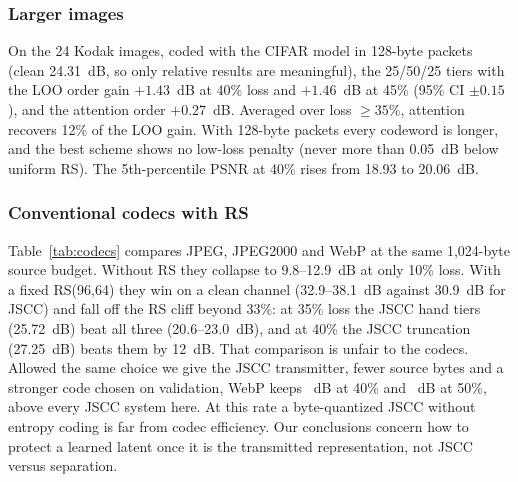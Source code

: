 \documentclass[journal]{IEEEtran}
\begin{document}
\subsubsection{Larger images}
On the 24 Kodak images, coded with the CIFAR model in 128-byte packets (clean 24.31~dB, so only relative
results are meaningful), the 25/50/25 tiers with the LOO order gain $+1.43$~dB at 40\% loss and
$+1.46$~dB at 45\% (95\% CI $\pm0.15$), and the attention order $+0.27$~dB. Averaged over loss $\ge35\%$,
attention recovers 12\% of the LOO gain. With 128-byte packets every codeword is longer, and the best
scheme shows no low-loss penalty (never more than 0.05~dB below uniform RS). The 5th-percentile PSNR at
40\% rises from 18.93 to 20.06~dB.

\subsubsection{Conventional codecs with RS}
Table~\ref{tab:codecs} compares JPEG, JPEG2000 and WebP at the same 1,024-byte source budget. Without RS
they collapse to 9.8--12.9~dB at only 10\% loss. With a fixed RS(96,64) they win on a clean channel
(32.9--38.1~dB against 30.9~dB for JSCC) and fall off the RS cliff beyond 33\%: at 35\% loss the JSCC
hand tiers (25.72~dB) beat all three (20.6--23.0~dB), and at 40\% the JSCC truncation (27.25~dB) beats
them by 12~dB. That comparison is unfair to the codecs. Allowed the same choice we give the JSCC
transmitter, fewer source bytes and a stronger code chosen on validation, WebP keeps
\WebpAdaptiveForty~dB at 40\% and \WebpAdaptiveFifty~dB at 50\%, above every JSCC system here. At this
rate a byte-quantized JSCC without entropy coding is far from codec efficiency. Our conclusions concern
how to protect a learned latent once it is the transmitted representation, not JSCC versus separation.
\end{document}
